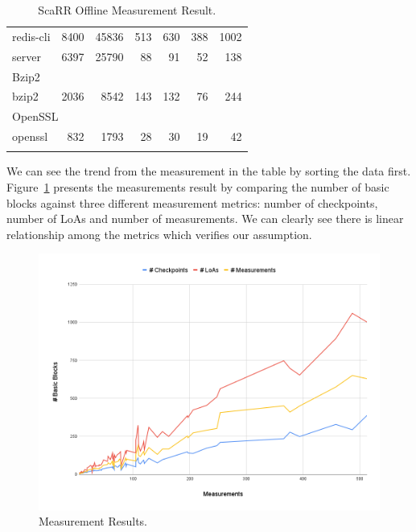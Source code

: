 \begin{longtable}{lrrrrrr}
    redis-cli       & 8400       & 45836    & 513             & 630             & 388            & 1002       \\
    server          & 6397       & 25790    & 88              & 91              & 52             & 138       \\
    \midrule 
    \multicolumn{7}{l}{Bzip2} \\
    \midrule 
    bzip2           & 2036       & 8542    & 143             & 132             & 76            & 244       \\
    \midrule 
    \multicolumn{7}{l}{OpenSSL} \\
    \midrule 
    openssl         & 832        & 1793    & 28              & 30              & 19            & 42       \\
    \bottomrule
    \caption{ScaRR Offline Measurement Result.}
    \label{table:scarr-result}
    \end{longtable}

We can see the trend from the measurement in the table by sorting the data
first. Figure~\ref{fig:measurement-result} presents the measurements result by
comparing the number of basic blocks against three different measurement
metrics: number of checkpoints, number of LoAs and number of measurements. We
can clearly see there is linear relationship among the metrics which verifies
our assumption.

\begin{figure}[h]
    \centerline{\includegraphics[scale=.45]{Figures/05/scarr-result.png}}
    \caption{Measurement Results.} 
    \label{fig:measurement-result}
\end{figure}


